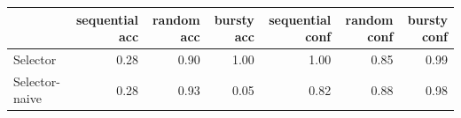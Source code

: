 \begin{tabular}{lrrrrrr}\toprule
 & sequential acc & random acc & bursty acc & sequential conf & random conf & bursty conf\\\midrule
Selector & 0.28 & 0.90 & 1.00 & 1.00 & 0.85 & 0.99\\
Selector-naive & 0.28 & 0.93 & 0.05 & 0.82 & 0.88 & 0.98\\
\bottomrule\end{tabular}
